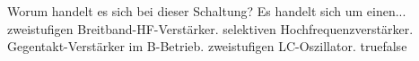     {Worum handelt es sich bei dieser Schaltung? Es handelt sich um einen...}
    {zweistufigen Breitband-HF-Verstärker.}
    {selektiven Hochfrequenzverstärker.}
    {Gegentakt-Verstärker im B-Betrieb.}
    {zweistufigen LC-Oszillator.}
    {true}{false}